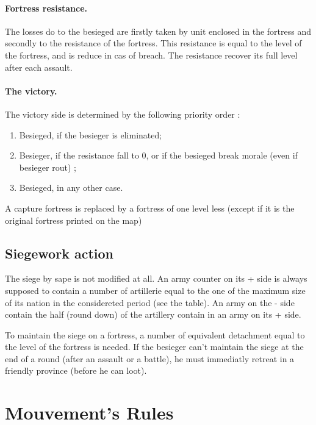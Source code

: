 \paragraph{Fortress resistance.}
The losses do to the besieged are firstly taken by unit enclosed in the 
fortress and secondly to the resistance of the fortress.
This resistance is equal to the level of the fortress, and is reduce in 
cas of
breach. The resistance recover its full level after each
assault.

\paragraph{The victory.} The victory side is determined by the following  
priority order :
\begin{enumerate}
\item Besieged, if the besieger is eliminated;
\item Besieger, if the resistance fall to 0, or if the besieged break morale (even if besieger rout) ;
\item Besieged, in any other case.
\end{enumerate}

A capture fortress is replaced by a fortress of one level less (except if 
it is the original fortress printed on the map)

\artillerie

\subsection{Siegework action}
\noindent
The siege by sape is not modified at all. An army counter on its + side 
is always supposed to contain a number of artillerie 
equal to the one of the maximum size of its nation in the considereted 
period (see the table). An army on the - side contain the 
half  (round down) of the artillery contain in an army on its + side.

To maintain the siege on a fortress, a number of equivalent detachment 
equal to the level of the fortress is needed. If the 
besieger can't maintain the siege at the end of a round (after an assault 
or a battle), he must immediatly retreat in a friendly province
(before he can loot).


\section{Mouvement's Rules}

